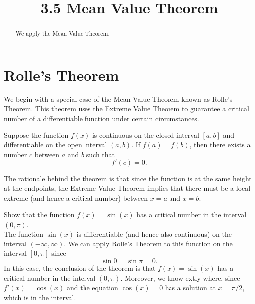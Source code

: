 \documentclass{ximera}
\title{3.5 Mean Value Theorem}
\begin{document}
\begin{abstract}
We apply the Mean Value Theorem.
\end{abstract}

\maketitle

\section{Rolle's Theorem}
We begin with a special case of the Mean Value Theorem known as Rolle's Theorem.
This theorem uses the Extreme Value Theorem to guarantee a critical number of a differentiable function under certain circumstances.

\begin{theorem}
Suppose the function $f(x)$ is continuous on the closed interval $[a,b]$ and differentiable on the open interval $(a,b)$.
If $f(a) = f(b)$, then there exists a number $c$ between $a$ and $b$ such that 
\[
f'(c) = 0.
\]
\end{theorem}

\begin{image}
\end{image}
The rationale behind the theorem is that since the function is at the same height at the endpoints, the Extreme Value Theorem implies that
there must be a local extreme (and hence a critical number) between $x = a$ and $x = b$.

\begin{example} Show that the function $f(x) = \sin(x)$ has a critical number in the interval $(0, \pi)$.\\
The function $\sin(x)$ is differentiable (and hence also continuous) on the interval $(-\infty, \infty)$.
We can apply Rolle's Theorem to this function on the interval $[0, \pi]$ since
\[
\sin 0 = \sin \pi = 0.
\]
In this case, the conclusion of the theorem is that $f(x) = \sin(x)$ has a critical number in the interval $(0, \pi)$.
Moreover, we know extly where, since $f'(x) = \cos(x)$ and the equation $\cos(x) = 0$ has a solution at $x = \pi/2$, which is in the interval.
\end{example}
\end{document}
